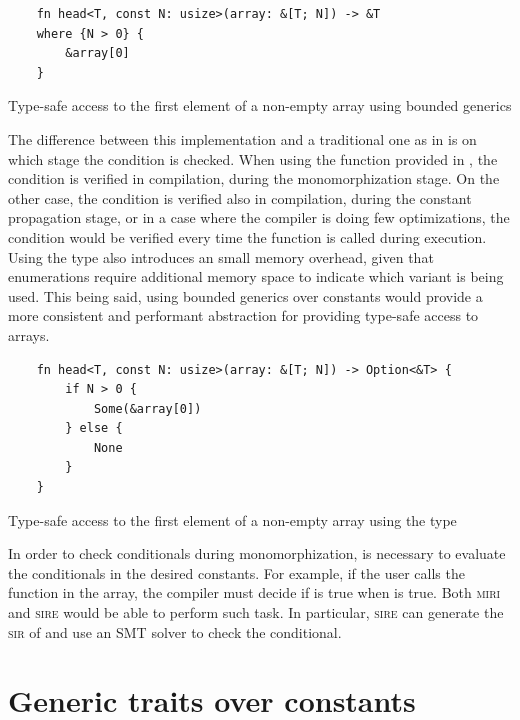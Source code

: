 \begin{listing}[h]
	\begin{verbatim}
    fn head<T, const N: usize>(array: &[T; N]) -> &T
    where {N > 0} {
        &array[0]
    }
    \end{verbatim}
    \caption{Type-safe access to the first element of a non-empty array using bounded generics}
  \label{lst:head_const_generics}
\end{listing}

The difference between this implementation and a traditional one as in
 is on which stage the condition  is
checked. When using the function provided in ,
the condition is verified in compilation, during the monomorphization stage. On
the other case, the condition is verified also in compilation, during the
constant propagation stage, or in a case where the compiler is doing few
optimizations, the condition would be verified every time the function is
called during execution. Using the  type also introduces an
small memory overhead, given that enumerations require additional memory space
to indicate which variant is being used. This being said, using bounded
generics over constants would provide a more consistent and performant
abstraction for providing type-safe access to arrays.

\begin{listing}[h]
	\begin{verbatim}
    fn head<T, const N: usize>(array: &[T; N]) -> Option<&T> {
        if N > 0 {
            Some(&array[0])
        } else {
            None
        }
    }
    \end{verbatim}
    \caption{Type-safe access to the first element of a non-empty array using the  type}
  \label{lst:head_no_bounds}
\end{listing}

In order to check conditionals during monomorphization, is necessary to
evaluate the conditionals in the desired constants.  For example, if the user
calls the  function in the \inrust{[1, 2, 3]} array, the compiler
must decide if  is true when  is true.  Both
\textsc{miri} and \textsc{sire} would be able to perform such task. In
particular, \textsc{sire} can generate the \textsc{sir} of  and
use an SMT solver to check the conditional.

\section{Generic traits over constants}

